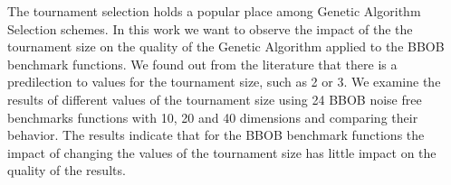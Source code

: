 The tournament selection holds a popular place among Genetic Algorithm Selection schemes. In this work we want to observe the impact of the the tournament size on the quality of the Genetic Algorithm applied to the BBOB benchmark functions. We found out from the literature that there is a predilection to values for the tournament size, such as 2 or 3. We examine the results of different values of the tournament size using 24 BBOB noise free benchmarks functions with 10, 20 and 40 dimensions and comparing their behavior. The results indicate that for the BBOB benchmark functions the impact of changing the values of the tournament size has little impact on the quality of the results.